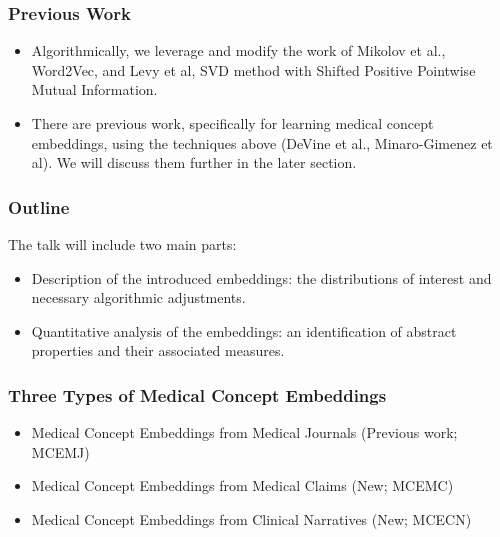 \documentclass{beamer}
\begin{document}
\begin{frame}
\frametitle{Previous Work}
\begin{itemize}
\item Algorithmically, we leverage and modify 
the work of Mikolov et al., Word2Vec,
and Levy et al, SVD method with Shifted Positive
Pointwise Mutual Information.

\bigskip

\item There are previous work, specifically for
learning medical concept embeddings, using the
techniques above (DeVine et al., Minaro-Gimenez et al).
We will discuss them further in the
later section. 

\end{itemize}
\end{frame}

\begin{frame}
\frametitle{Outline}
\begin{center}
The talk will include two main parts:

\bigskip

\begin{itemize}
\item Description of the introduced embeddings: 
the distributions of interest 
and necessary algorithmic adjustments.

\bigskip

\item Quantitative analysis of the embeddings:
an identification of abstract properties
and their associated measures.


\end{itemize}
\end{center}
\end{frame}

\begin{frame}
\frametitle{Three Types of Medical Concept Embeddings}
\begin{itemize}
\item Medical Concept Embeddings from Medical
Journals (Previous work; MCEMJ)

\bigskip

\item Medical Concept Embeddings from Medical Claims 
(New; MCEMC)

\bigskip

\item Medical Concept Embeddings from Clinical 
Narratives (New; MCECN)
\end{itemize}
\end{frame}
\end{document}
